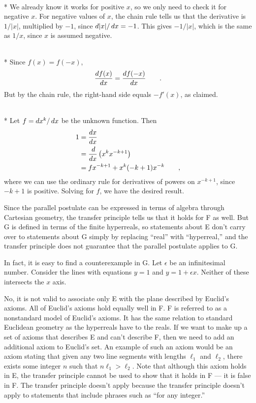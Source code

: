 \\*
We already know it works for positive $x$, so we only need to check it for negative $x$.
For negative values of $x$, the chain rule tells us that the derivative is $1/|x|$,
multiplied by $-1$, since $\mathop{d\!}|x|/\mathop{d\!} x=-1$. This gives $-1/|x|$, which is the same
as $1/x$, since $x$ is assumed negative.

\\*
Since $f(x)=f(-x)$, 
\begin{equation*}
  \frac{\mathop{d\!} f(x)}{\mathop{d\!} x} =   \frac{\mathop{d\!} f(-x)}{\mathop{d\!} x} \qquad .
\end{equation*}
But by the chain rule, the right-hand side equals $-f'(x)$, as claimed.

\\*
Let $f=\mathop{d\!} x^k/\mathop{d\!} x$ be the unknown function. Then
\begin{align*}
  1 &= \frac{\mathop{d\!} x}{\mathop{d\!} x} \\
    &= \frac{\mathop{d\!} }{\mathop{d\!} x} \left(x^kx^{-k+1}\right) \\
    &= fx^{-k+1}+x^k(-k+1)x^{-k} \qquad ,
\end{align*}
where we can use the ordinary rule for derivatives of powers on $x^{-k+1}$, since $-k+1$ is positive. Solving for
$f$, we have the desired result.

Since the parallel postulate can be expressed in terms of algebra through Cartesian geometry, the transfer principle
tells us that it holds for F as well. But G is defined in terms of the finite hyperreals, so statements about E
don't carry over to statements about G simply by replacing ``real'' with ``hyperreal,'' and the transfer principle
does not guarantee that the parallel postulate applies to G. 

In fact, it is easy to find a counterexample in G.
Let $\epsilon$ be an infinitesimal number. Consider the lines with equations $y=1$ and $y=1+\epsilon x$. Neither
of these intersects the $x$ axis.

No, it is not valid to associate only E with the plane described by Euclid's axioms. All of Euclid's axioms hold
equally well in F. F is referred to as a nonstandard model of Euclid's axioms. It has the same relation to standard
Euclidean geometry as the hyperreals have to the reals. If we want to make up a set of axioms that describes E and
can't describe F, then we need to add an additional axiom to Euclid's set. An example of such an axiom would be
an axiom stating that given any two line segments with lengths $\ell_1$ and $\ell_2$, there exists some integer
$n$ such that $n\ell_1>\ell_2$. Note that although this axiom holds in E, the transfer principle cannot be used
to show that it holds in F --- it is false in F. The transfer principle doesn't apply because the transfer
principle doesn't apply to statements that include phrases such as ``for any integer.''

